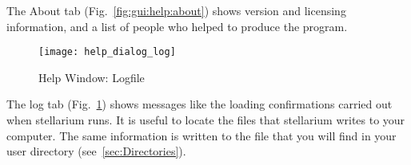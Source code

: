 The About tab (Fig.~\ref{fig:gui:help:about}) shows version and licensing information, and a list
of people who helped to produce the program.

\begin{figure}[htbp]
\centering\texttt{[image: help\_dialog\_log]}
\caption{Help Window: Logfile}
\label{fig:gui:help:log}
\end{figure}

The log tab (Fig.~\ref{fig:gui:help:log}) shows messages like the loading confirmations carried out when
stellarium runs. It is useful to locate the files that stellarium writes
to your computer. The same information is written to  the file  that you will
find in your user directory (see~\ref{sec:Directories}).




